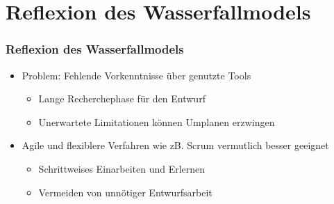 \section{Reflexion des Wasserfallmodels}

\begin{frame}\frametitle{Reflexion des Wasserfallmodels}
    \begin{itemize}
        \item Problem: Fehlende Vorkenntnisse über genutzte Tools 
            \begin{itemize}
                \item Lange Recherchephase für den Entwurf
                \item Unerwartete Limitationen können Umplanen erzwingen
            \end{itemize}
        \item Agile und flexiblere Verfahren wie zB. Scrum vermutlich besser geeignet
            \begin{itemize}
                \item Schrittweises Einarbeiten und Erlernen
                \item Vermeiden von unnötiger Entwurfsarbeit
            \end{itemize}
    \end{itemize}
\end{frame}